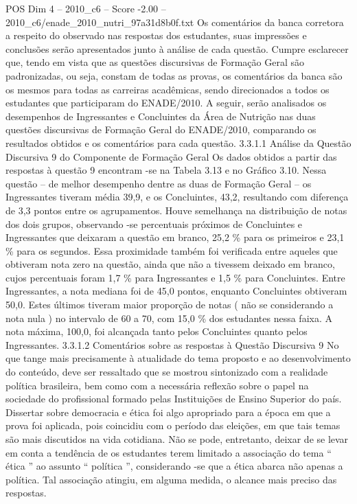 \begin{textsample}{POS Dim 4 – 2010\_c6 – Score -2.00 – 2010\_c6/enade\_2010\_nutri\_97a31d8b0f.txt}
Os comentários da banca corretora a respeito do observado nas respostas dos estudantes, suas impressões e conclusões serão apresentados junto à análise de cada questão.
Cumpre esclarecer que, tendo em vista que as questões discursivas de Formação Geral são padronizadas, ou seja, constam de todas as provas, os comentários da banca são os mesmos para todas as carreiras acadêmicas, sendo direcionados a todos os estudantes que participaram do ENADE/2010.
A seguir, serão analisados os desempenhos de Ingressantes e Concluintes da Área de Nutrição nas duas questões discursivas de Formação Geral do ENADE/2010, comparando os resultados obtidos e os comentários para cada questão. 3.3.1.1 Análise da Questão Discursiva 9 do Componente de Formação Geral Os dados obtidos a partir das respostas à questão 9 encontram -se na Tabela 3.13 e no Gráfico 3.10.
Nessa questão – de melhor desempenho dentre as duas de Formação Geral – os Ingressantes tiveram média 39,9, e os Concluintes, 43,2, resultando com diferença de 3,3 pontos entre os agrupamentos.
Houve semelhança na distribuição de notas dos dois grupos, observando -se percentuais próximos de Concluintes e Ingressantes que deixaram a questão em branco, 25,2 \% para os primeiros e 23,1 \% para os segundos.
Essa proximidade também foi verificada entre aqueles que obtiveram nota zero na questão, ainda que não a tivessem deixado em branco, cujos percentuais foram 1,7 \% para Ingressantes e 1,5 \% para Concluintes.
Entre Ingressantes, a nota mediana foi de 45,0 pontos, enquanto Concluintes obtiveram 50,0.
Estes últimos tiveram maior proporção de notas ( não se considerando a nota nula ) no intervalo de 60 a 70, com 15,0 \% dos estudantes nessa faixa.
A nota máxima, 100,0, foi alcançada tanto pelos Concluintes quanto pelos Ingressantes. 3.3.1.2 Comentários sobre as respostas à Questão Discursiva 9 No que tange mais precisamente à atualidade do tema proposto e ao desenvolvimento do conteúdo, deve ser ressaltado que se mostrou sintonizado com a realidade política brasileira, bem como com a necessária reflexão sobre o papel na sociedade do profissional formado pelas Instituições de Ensino Superior do país.
Dissertar sobre democracia e ética foi algo apropriado para a época em que a prova foi aplicada, pois coincidiu com o período das eleições, em que tais temas são mais discutidos na vida cotidiana.
Não se pode, entretanto, deixar de se levar em conta a tendência de os estudantes terem limitado a associação do tema “ ética ” ao assunto “ política ”, considerando -se que a ética abarca não apenas a política.
Tal associação atingiu, em alguma medida, o alcance mais preciso das respostas.

\end{textsample}
